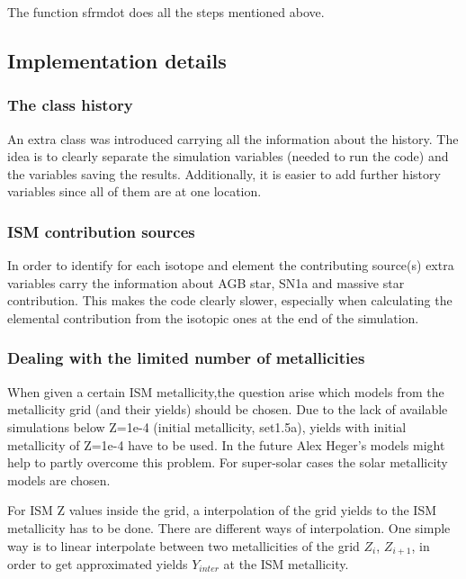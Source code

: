 {%
The function sfrmdot does all the steps mentioned above.

\subsection{Implementation details}

\subsubsection{The class history}

An extra class was introduced carrying
all the information about the history.
The idea is to clearly separate the 
simulation variables (needed to run
the code) and the variables saving
the results. Additionally, it is easier
to add further history variables since all
of them are at one location.

\subsubsection{ISM contribution sources}

In order to identify for each isotope and element
the contributing source(s) extra variables carry
the information about AGB star, SN1a and massive
star contribution. This makes the code clearly
slower, especially when calculating the elemental
contribution from the isotopic ones at the end
of the simulation.

\subsubsection{Dealing with the limited number of metallicities}

When given a certain ISM metallicity,the question arise which
models from the metallicity grid (and their yields) should be chosen.
Due to the lack of available simulations below Z=1e-4 (initial metallicity, set1.5a),
yields with initial metallicity of Z=1e-4 have to be used. In
the future Alex Heger's models might help to partly overcome this problem.
For super-solar cases the solar metallicity models are chosen.

For ISM Z values inside the grid, a interpolation of the grid yields
to the ISM metallicity has to be done.
There are different ways of interpolation. One simple way
is to linear interpolate between two metallicities of the grid 
$Z_i$, $Z_{i+1}$,
in order to get approximated yields $Y_{inter}$ at the ISM metallicity.

}
